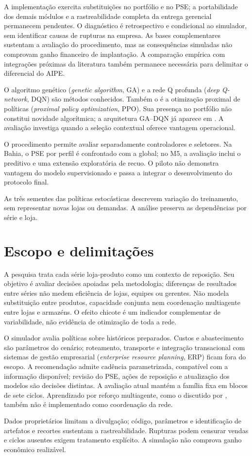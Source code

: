 A implementação exercita substituições no portfólio e no PSE; a portabilidade dos demais módulos e a rastreabilidade completa da entrega gerencial permanecem pendentes. O diagnóstico é retrospectivo e condicional ao simulador, sem identificar causas de rupturas na empresa. As bases complementares sustentam a avaliação do procedimento, mas as consequências simuladas não comprovam ganho financeiro de implantação. A comparação empírica com integrações próximas da literatura também permanece necessária para delimitar o diferencial do AIPE.

O algoritmo genético (\textit{genetic algorithm}, GA) e a rede Q profunda (\textit{deep Q-network}, DQN) são métodos conhecidos. Também o é a otimização proximal de políticas (\textit{proximal policy optimization}, PPO). Sua presença no portfólio não constitui novidade algorítmica; a arquitetura GA--DQN já aparece em \citet{Zabraoui2025GaDQN}. A avaliação investiga quando a seleção contextual oferece vantagem operacional.

O procedimento permite avaliar separadamente controladores e seletores. Na Bahia, o PSE por perfil é confrontado com a global; no M5, a avaliação inclui o preditivo e uma extensão exploratória de recuo. O piloto não demonstra vantagem do modelo supervisionado e passa a integrar o desenvolvimento do protocolo final.

As três sementes das políticas estocásticas descrevem variação do treinamento, sem representar novas lojas ou demandas. A análise preserva as dependências por série e loja.

\section{Escopo e delimitações}
\label{sec:delimitacoes}

A pesquisa trata cada série loja-produto como um contexto de reposição. Seu objetivo é avaliar decisões apoiadas pela metodologia; diferenças de resultados entre séries não medem eficiência de lojas, equipes ou gerentes. Não modela substituição entre produtos, capacidade conjunta nem coordenação multiagente entre lojas e armazéns. O efeito chicote é um indicador complementar de variabilidade, não evidência de otimização de toda a rede.

O simulador avalia políticas sobre históricos preparados. Custos e abastecimento são parâmetros do cenário; roteamento, transporte e integração transacional com sistemas de gestão empresarial (\textit{enterprise resource planning}, ERP) ficam fora do escopo. A recomendação admite cadência parametrizada, compatível com a informação disponível; revisão do PSE, ações de reposição e atualização dos modelos são decisões distintas. A avaliação atual mantém a família fixa em blocos de sete ciclos. Aprendizado por reforço multiagente, como o discutido por \citet{Liu2024HAPPO}, também não é implementado como coordenação da rede.

Dados proprietários limitam a divulgação; código, parâmetros e identificação de artefatos e recortes sustentam a rastreabilidade. Rupturas podem censurar vendas e ciclos ausentes exigem tratamento explícito. A simulação não comprova ganho econômico realizável.

\newpage\lhead{\rightmark}
